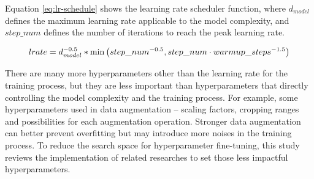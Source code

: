 Equation \ref{eq:lr-schedule} shows the learning rate scheduler function, where $d_{model}$ defines the maximum learning rate applicable to the model complexity, and $step\_num$ defines the number of iterations to reach the peak learning rate.

\begin{equation}
    lrate=d_{model}^{-0.5} * \min \left(step\_num^{-0.5}, step\_num \cdot  warmup\_steps^{-1.5}\right)
    \eqcite{vaswani2017attention}
    \label{eq:lr-schedule}
\end{equation}

There are many more hyperparameters other than the learning rate for the training process, but they are less important than hyperparameters that directly controlling the model complexity and the training process.
For example, some hyperparameters used in data augmentation -- scaling factors, cropping ranges and possibilities for each augmentation operation.
Stronger data augmentation can better prevent overfitting but may introduce more noises in the training process.
To reduce the search space for hyperparameter fine-tuning, this study reviews the implementation of related researches to set those less impactful hyperparameters.
